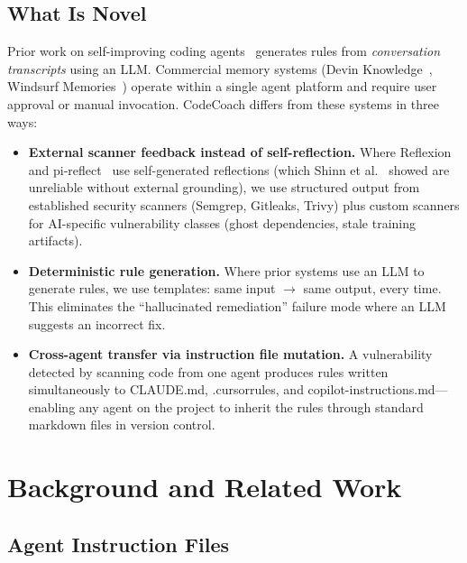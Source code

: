 \documentclass[conference,10pt]{IEEEtran}
\begin{document}
\subsection{What Is Novel}
\label{sec:novelty}

Prior work on self-improving coding agents~\cite{pi-reflect, bmo, osmani-survey} generates rules from \textit{conversation transcripts} using an LLM. Commercial memory systems (Devin Knowledge~\cite{devin}, Windsurf Memories~\cite{windsurf}) operate within a single agent platform and require user approval or manual invocation. CodeCoach differs from these systems in three ways:

\begin{itemize}
    \item \textbf{External scanner feedback instead of self-reflection.} Where Reflexion~\cite{reflexion} and pi-reflect~\cite{pi-reflect} use self-generated reflections (which Shinn et al.~\cite{shinn-correction} showed are unreliable without external grounding), we use structured output from established security scanners (Semgrep, Gitleaks, Trivy) plus custom scanners for AI-specific vulnerability classes (ghost dependencies, stale training artifacts).

    \item \textbf{Deterministic rule generation.} Where prior systems use an LLM to generate rules, we use templates: same input $\rightarrow$ same output, every time. This eliminates the ``hallucinated remediation'' failure mode where an LLM suggests an incorrect fix.

    \item \textbf{Cross-agent transfer via instruction file mutation.} A vulnerability detected by scanning code from one agent produces rules written simultaneously to CLAUDE.md, .cursorrules, and copilot-instructions.md---enabling any agent on the project to inherit the rules through standard markdown files in version control.
\end{itemize}

\section{Background and Related Work}

\subsection{Agent Instruction Files}
\end{document}
